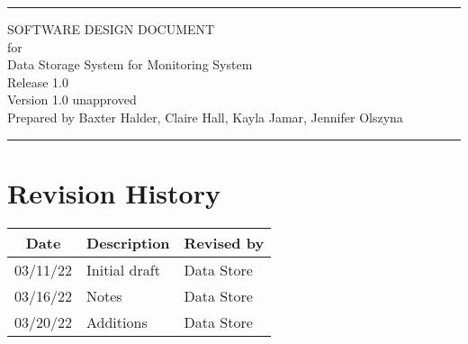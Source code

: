 \documentclass[letterpaper,12pt,oneside,listof=totoc]{scrreprt}
\date{\today}
\author{} %
\def\myversion{1.0 }
\begin{document}
\begin{titlepage}
\flushright
\rule{\textwidth}{5pt}\vskip1cm
\Huge{SOFTWARE DESIGN DOCUMENT}\\
\vspace{1.5cm}
for\\
\vspace{1.5cm}
Data Storage System for Monitoring System\\
\vspace{1.5cm}
\LARGE{Release 1.0\\}
\vspace{1.5cm}
\LARGE{Version \myversion unapproved\\}
\vspace{1.5cm}
Prepared by Baxter Halder, Claire Hall, Kayla Jamar, Jennifer Olszyna\\
\vfill
\rule{\textwidth}{5pt}
\end{titlepage}

\tableofcontents

\listoffigures

\listoftables

\chapter*{Revision History}

\begin{tabular}{| c | p{} | p{} |}
\hline
Date     & Description   & Revised by \\
\hline
03/11/22 & Initial draft & Data Store \\
\hline
03/16/22 & Notes & Data Store \\
\hline
03/20/22 & Additions & Data Store \\
\hline
\end{tabular}
\end{document}
